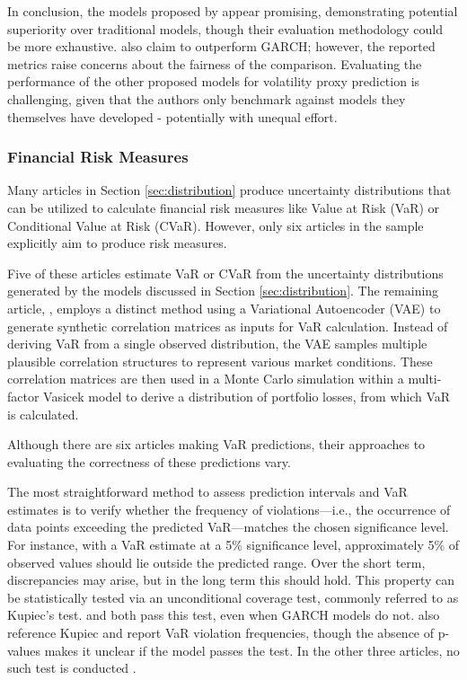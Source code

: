 In conclusion, the models proposed by \textcite{xing2019sentiment,Platanios2014gpr,tegner2021probabilistic} appear promising, demonstrating potential superiority over traditional models, though their evaluation methodology could be more exhaustive. \textcite{Parker2021BayesianHeteroskedastic} also claim to outperform GARCH; however, the reported metrics raise concerns about the fairness of the comparison. Evaluating the performance of the other proposed models for volatility proxy prediction is challenging, given that the authors only benchmark against models they themselves have developed - potentially with unequal effort.




\subsubsection{Financial Risk Measures}
\label{sec:financial_risk_measures}

Many articles in Section \ref{sec:distribution} produce uncertainty distributions that can be utilized to calculate financial risk measures like Value at Risk (VaR) or Conditional Value at Risk (CVaR). However, only six articles in the sample explicitly aim to produce risk measures.

Five of these articles estimate VaR or CVaR from the uncertainty distributions generated by the models discussed in Section \ref{sec:distribution}. The remaining article, \textcite{caprioli2023quantifying}, employs a distinct method using a Variational Autoencoder (VAE) to generate synthetic correlation matrices as inputs for VaR calculation. Instead of deriving VaR from a single observed distribution, the VAE samples multiple plausible correlation structures to represent various market conditions. These correlation matrices are then used in a Monte Carlo simulation within a multi-factor Vasicek model to derive a distribution of portfolio losses, from which VaR is calculated.

Although there are six articles making VaR predictions, their approaches to evaluating the correctness of these predictions vary.

The most straightforward method to assess prediction intervals and VaR estimates is to verify whether the frequency of violations—i.e., the occurrence of data points exceeding the predicted VaR—matches the chosen significance level. For instance, with a VaR estimate at a 5\% significance level, approximately 5\% of observed values should lie outside the predicted range. Over the short term, discrepancies may arise, but in the long term this should hold. This property can be statistically tested via an unconditional coverage test, commonly referred to as Kupiec's test. \textcite{Fatouros2023DeepVaR} and \textcite{arian2022encoded} both pass this test, even when GARCH models do not. \textcite{Horenko2020} also reference Kupiec and report VaR violation frequencies, though the absence of p-values makes it unclear if the model passes the test. In the other three articles, no such test is conducted \textcite{Almeida2024RiskForecasting, Risk2018gpr, caprioli2023quantifying}.

